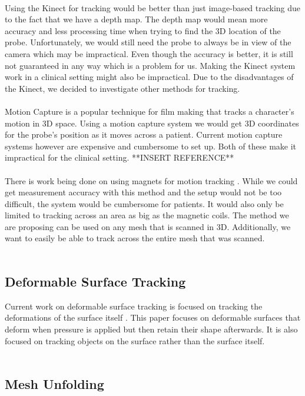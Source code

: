 \\
Using the Kinect for tracking would be better than just image-based tracking due to the fact that we have a depth map. The depth map would mean more accuracy and less processing time when trying to find the 3D location of the probe. Unfortunately, we would still need the probe to always be in view of the camera which may be impractical. Even though the accuracy is better, it is still not guaranteed in any way which is a problem for us. Making the Kinect system work in a clinical setting might also be impractical. Due to the disadvantages of the Kinect, we decided to investigate other methods for tracking. \\
\\
Motion Capture is a popular technique for film making that tracks a character's motion in 3D space. Using a motion capture system we would get 3D coordinates for the probe's position as it moves across a patient. Current motion capture systems however are expensive and cumbersome to set up. Both of these make it impractical for the clinical setting. **INSERT REFERENCE**\\
\\
There is work being done on using magnets for motion tracking \cite{magnetictracking}. While we could get measurement accuracy with this method and the setup would not be too difficult, the system would be cumbersome for patients. It would also only be limited to tracking across an area as big as the magnetic coils. The method we are proposing can be used on any mesh that is scanned in 3D. Additionally, we want to easily be able to track across the entire mesh that was scanned.\\
\\

\subsection{Deformable Surface Tracking}

Current work on deformable surface tracking is focused on tracking the deformations of the surface itself \cite{deformableobjecttracking,convexopt}. This paper focuses on deformable surfaces that deform when pressure is applied but then retain their shape afterwards. It is also focused on tracking objects on the surface rather than the surface itself.\\
\\

\subsection{Mesh Unfolding}

